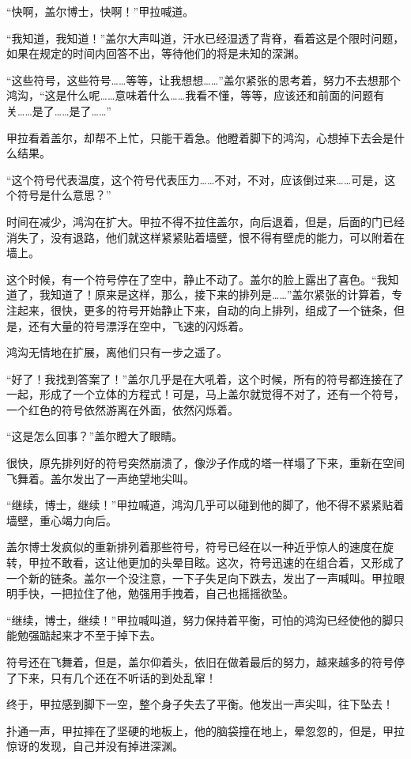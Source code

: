 “快啊，盖尔博士，快啊！”甲拉喊道。 

“我知道，我知道！”盖尔大声叫道，汗水已经湿透了背脊，看着这是个限时问题，如果在规定的时间内回答不出，等待他们的将是未知的深渊。 

“这些符号，这些符号……等等，让我想想……”盖尔紧张的思考着，努力不去想那个鸿沟，“这是什么呢……意味着什么……我看不懂，等等，应该还和前面的问题有关……是了……是了……” 

甲拉看着盖尔，却帮不上忙，只能干着急。他瞪着脚下的鸿沟，心想掉下去会是什么结果。 

“这个符号代表温度，这个符号代表压力……不对，不对，应该倒过来……可是，这个符号是什么意思？” 

时间在减少，鸿沟在扩大。甲拉不得不拉住盖尔，向后退着，但是，后面的门已经消失了，没有退路，他们就这样紧紧贴着墙壁，恨不得有壁虎的能力，可以附着在墙上。 

这个时候，有一个符号停在了空中，静止不动了。盖尔的脸上露出了喜色。“我知道了，我知道了！原来是这样，那么，接下来的排列是……”盖尔紧张的计算着，专注起来，很快，更多的符号开始静止下来，自动的向上排列，组成了一个链条，但是，还有大量的符号漂浮在空中，飞速的闪烁着。 

鸿沟无情地在扩展，离他们只有一步之遥了。 

“好了！我找到答案了！”盖尔几乎是在大吼着，这个时候，所有的符号都连接在了一起，形成了一个立体的方程式！可是，马上盖尔就觉得不对了，还有一个符号，一个红色的符号依然游离在外面，依然闪烁着。 

“这是怎么回事？”盖尔瞪大了眼睛。 

很快，原先排列好的符号突然崩溃了，像沙子作成的塔一样塌了下来，重新在空间飞舞着。盖尔发出了一声绝望地尖叫。 

“继续，博士，继续！”甲拉喊道，鸿沟几乎可以碰到他的脚了，他不得不紧紧贴着墙壁，重心竭力向后。 

盖尔博士发疯似的重新排列着那些符号，符号已经在以一种近乎惊人的速度在旋转，甲拉不敢看，这让他更加的头晕目眩。这次，符号迅速的在组合着，又形成了一个新的链条。盖尔一个没注意，一下子失足向下跌去，发出了一声喊叫。甲拉眼明手快，一把拉住了他，勉强用手拽着，自己也摇摇欲坠。 

“继续，博士，继续！”甲拉喊叫道，努力保持着平衡，可怕的鸿沟已经使他的脚只能勉强踮起来才不至于掉下去。 

符号还在飞舞着，但是，盖尔仰着头，依旧在做着最后的努力，越来越多的符号停了下来，只有几个还在不听话的到处乱窜！ 

终于，甲拉感到脚下一空，整个身子失去了平衡。他发出一声尖叫，往下坠去！ 

扑通一声，甲拉摔在了坚硬的地板上，他的脑袋撞在地上，晕忽忽的，但是，甲拉惊讶的发现，自己并没有掉进深渊。 

